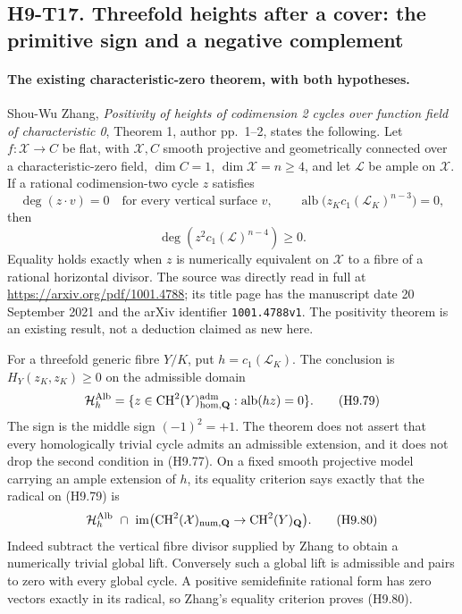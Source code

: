
\subsection*{H9-T17. Threefold heights after a cover: the primitive sign and a negative complement}

\paragraph{The existing characteristic-zero theorem, with both hypotheses.}
Shou-Wu Zhang, \emph{Positivity of heights of codimension 2 cycles
over function field of characteristic 0}, Theorem 1, author pp.~1--2,
states the following. Let $f:\mathcal X\to C$ be flat, with
$\mathcal X,C$ smooth projective and geometrically connected over a
characteristic-zero field, $\dim C=1$, $\dim\mathcal X=n\ge4$,
and let $\mathcal L$ be ample on $\mathcal X$. If a rational
codimension-two cycle $z$ satisfies
\[
 \deg(z\cdot v)=0\quad\text{for every vertical surface }v,
 \qquad
 \operatorname{alb}\bigl(z_Kc_1(\mathcal L_K)^{n-3}\bigr)=0,
                                                               \tag{H9.77}
\]
then
\[
                  \deg(z^2c_1(\mathcal L)^{n-4})\ge0.
                                                               \tag{H9.78}
\]
Equality holds exactly when $z$ is numerically equivalent on
$\mathcal X$ to a fibre of a rational horizontal divisor.
The source was directly read in full at
\url{https://arxiv.org/pdf/1001.4788}; its title page has the
manuscript date 20 September 2021 and the arXiv identifier
\texttt{1001.4788v1}. The positivity theorem is an existing result,
not a deduction claimed as new here.

For a threefold generic fibre $Y/K$, put $h=c_1(\mathcal L_K)$.
The conclusion is $H_Y(z_K,z_K)\ge0$ on the admissible domain
\[
 \mathcal H_h^{\rm Alb}
    =\{z\in\operatorname{CH}^2(Y)_{\rm hom,\mathbf Q}^{\rm adm}:
                  \operatorname{alb}(hz)=0\}.               \tag{H9.79}
\]
The sign is the middle sign $(-1)^2=+1$. The theorem does not
assert that every homologically trivial cycle admits an admissible
extension, and it does not drop the second condition in (H9.77).
On a fixed smooth projective model carrying an ample extension of
$h$, its equality criterion says exactly that the radical on
(H9.79) is
\[
 \mathcal H_h^{\rm Alb}\ \cap\
 \operatorname{im}\bigl(\operatorname{CH}^2(\mathcal X)_{
      \rm num,\mathbf Q}\to\operatorname{CH}^2(Y)_{\mathbf Q}\bigr).
                                                               \tag{H9.80}
\]
Indeed subtract the vertical fibre divisor supplied by Zhang to
obtain a numerically trivial global lift. Conversely such a global
lift is admissible and pairs to zero with every global cycle. A
positive semidefinite rational form has zero vectors exactly in
its radical, so Zhang's equality criterion proves (H9.80).

